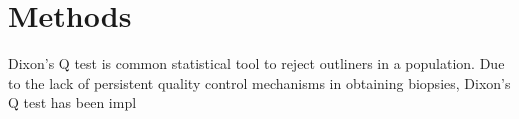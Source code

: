 \chapter{Methods}

Dixon's Q test is common statistical tool to reject outliners in a population. Due to the lack of persistent quality control mechanisms in obtaining biopsies, Dixon's Q test has been impl
